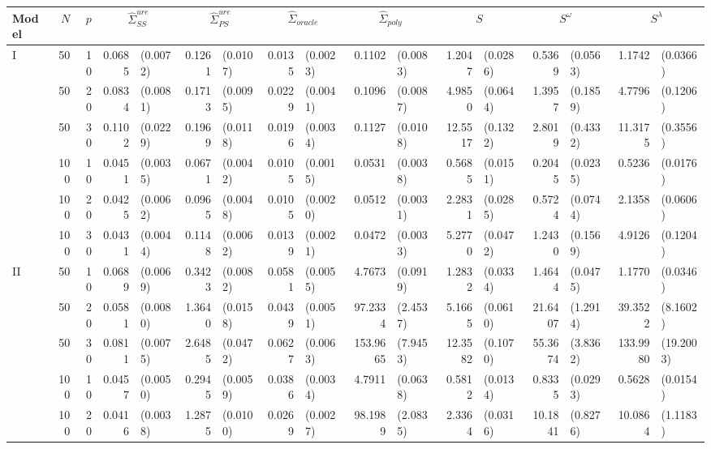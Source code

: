 \begin{landscape}
\begin{table}[H]
\begin{scriptsize}
\label{table:master-entropy-risk-table}
\begin{tabular}{lrrrlrlrlrlrlrlrl}
   Model & $N$ & $p$ & \multicolumn{2}{c}{$\hat{\Sigma}^{ure}_{SS}$} & \multicolumn{2}{c}{$\hat{\Sigma}^{ure}_{PS}$} & \multicolumn{2}{c}{$\hat{\Sigma}_{oracle}$} & \multicolumn{2}{c}{$\hat{\Sigma}_{poly}$} & \multicolumn{2}{c}{$S$} & \multicolumn{2}{c}{$S^\omega$} & \multicolumn{2}{c}{$S^\lambda$}\\ \hline
I & 50 & 10 & 0.0685 & (0.0072) & 0.1261 & (0.0107) & 0.0135 & (0.0023) & 0.1102 & (0.0083) & 1.2047 & (0.0286) & 0.5369 & (0.0563) & 1.1742 & (0.0366) \\ 
    & 50 & 20 & 0.0834 & (0.0081) & 0.1713 & (0.0095) & 0.0229 & (0.0041) & 0.1096 & (0.0087) & 4.9850 & (0.0644) & 1.3957 & (0.1859) & 4.7796 & (0.1206) \\ 
    & 50 & 30 & 0.1102 & (0.0229) & 0.1969 & (0.0118) & 0.0196 & (0.0034) & 0.1127 & (0.0108) & 12.5517 & (0.1322) & 2.8019 & (0.4332) & 11.3175 & (0.3556) \\ 
    & 100 & 10 & 0.0451 & (0.0035) & 0.0671 & (0.0042) & 0.0105 & (0.0015) & 0.0531 & (0.0038) & 0.5685 & (0.0151) & 0.2045 & (0.0235) & 0.5236 & (0.0176) \\ 
    & 100 & 20 & 0.0425 & (0.0062) & 0.0965 & (0.0048) & 0.0105 & (0.0020) & 0.0512 & (0.0031) & 2.2831 & (0.0285) & 0.5724 & (0.0744) & 2.1358 & (0.0606) \\ 
    & 100 & 30 & 0.0431 & (0.0044) & 0.1148 & (0.0062) & 0.0139 & (0.0021) & 0.0472 & (0.0033) & 5.2770 & (0.0472) & 1.2430 & (0.1569) & 4.9126 & (0.1204) \\ 
   \hline
II & 50 & 10 & 0.0689 & (0.0069) & 0.3423 & (0.0082) & 0.0581 & (0.0055) & 4.7673 & (0.0919) & 1.2832 & (0.0334) & 1.4644 & (0.0475) & 1.1770 & (0.0346) \\ 
    & 50 & 20 & 0.0581 & (0.0080) & 1.3640 & (0.0158) & 0.0439 & (0.0051) & 97.2334 & (2.4537) & 5.1665 & (0.0610) & 21.6407 & (1.2914) & 39.3522 & (8.1602) \\ 
    & 50 & 30 & 0.0811 & (0.0075) & 2.6485 & (0.0472) & 0.0627 & (0.0063) & 153.9665 & (7.9453) & 12.3582 & (0.1070) & 55.3674 & (3.8362) & 133.9980 & (19.2003) \\ 
    & 100 & 10 & 0.0457 & (0.0050) & 0.2945 & (0.0059) & 0.0386 & (0.0034) & 4.7911 & (0.0638) & 0.5812 & (0.0134) & 0.8335 & (0.0293) & 0.5628 & (0.0154) \\ 
    & 100 & 20 & 0.0416 & (0.0038) & 1.2875 & (0.0100) & 0.0269 & (0.0027) & 98.1989 & (2.0835) & 2.3364 & (0.0316) & 10.1841 & (0.8276) & 10.0864 & (1.1183) \\ 

\end{tabular}
\end{scriptsize}
\end{table}
\end{landscape}

